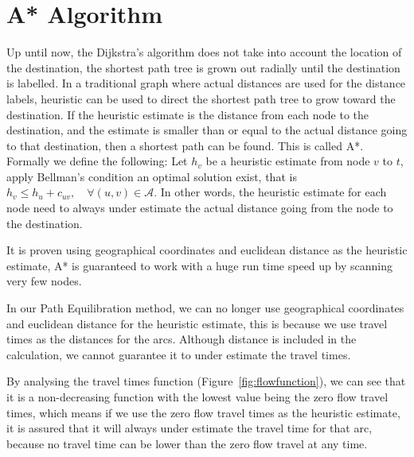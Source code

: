 \section{A* Algorithm}
Up until now,
the Dijkstra's algorithm does not take into account the location of the destination,
the shortest path tree is grown out radially until the destination is labelled.
In a traditional graph where actual distances are used for the distance labels,
heuristic can be used to direct the shortest path tree to grow toward the destination.
If the heuristic estimate is the distance from each node to the destination,
and the estimate is smaller than or equal to the actual distance going to that destination,
then a shortest path can be found. This is called A*.
Formally we define the following: Let $h_v$ be a heuristic estimate from node $v$ to $t$,
apply Bellman's condition an optimal solution exist, that is 
$ h_v \leq h_u + c_{uv}, \quad \forall(u,v) \in \mathcal{A} $.
In other words, the heuristic estimate for each node need to always under estimate the actual distance
going from the node to the destination.

It is proven using geographical coordinates and euclidean distance as the heuristic estimate,
A* is guaranteed to work with a huge run time speed up by scanning very few nodes.


In our Path Equilibration method,
we can no longer use geographical coordinates and euclidean distance for the heuristic estimate,
this is because we use travel times as the distances for the arcs.
Although distance is included in the calculation,
we cannot guarantee it to under estimate the travel times.

By analysing the travel times function (Figure~\ref{fig:flowfunction}),
we can see that it is a non-decreasing function with the lowest value being the zero flow travel times,
which means if we use the zero flow travel times as the heuristic estimate,
it is assured that it will always under estimate the travel time for that arc,
because no travel time can be lower than the zero flow travel at any time.

